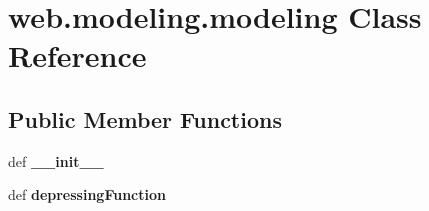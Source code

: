 \hypertarget{classweb_1_1modeling_1_1modeling}{\section{web.\-modeling.\-modeling Class Reference}
\label{classweb_1_1modeling_1_1modeling}
}
\subsection*{Public Member Functions}
\begin{DoxyCompactItemize}
\item 
\hypertarget{classweb_1_1modeling_1_1modeling_a7898b83d4325000468bf3b19dd0cf009}{def {\bfseries \-\_\-\-\_\-init\-\_\-\-\_\-}}\label{classweb_1_1modeling_1_1modeling_a7898b83d4325000468bf3b19dd0cf009}

\item 
\hypertarget{classweb_1_1modeling_1_1modeling_ad21a9030cd229dc73b6318abff8733e6}{def {\bfseries depressing\-Function}}\label{classweb_1_1modeling_1_1modeling_ad21a9030cd229dc73b6318abff8733e6}

\end{DoxyCompactItemize}
